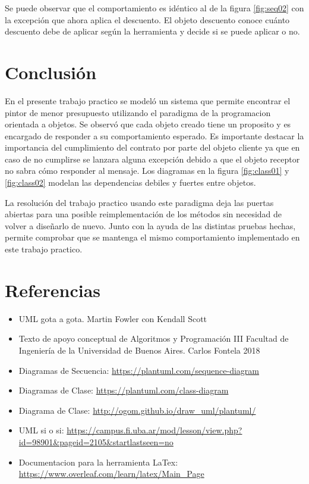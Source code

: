 \documentclass[titlepage,a4paper]{article}
\begin{document}
  Se puede observar que el comportamiento es idéntico al de la figura \ref{fig:seq02} 
  con la excepción que ahora aplica el descuento. El objeto descuento conoce cuánto descuento debe de aplicar según la herramienta 
  y decide si se puede aplicar o no.


  \section{Conclusión}
  
  En el presente trabajo practico se modeló un sistema que permite encontrar el pintor de menor presupuesto utilizando el paradigma de la programacion orientada a objetos. 
  Se observó que cada objeto creado tiene un proposito y es encargado de responder a su comportamiento esperado. Es importante destacar la 
  importancia del cumplimiento del contrato por parte del objeto cliente ya que en caso de no cumplirse se lanzara alguna excepción 
  debido a que el objeto receptor no sabra cómo responder al mensaje. Los diagramas en la figura \ref{fig:class01} y \ref{fig:class02} modelan las dependencias 
  debiles y fuertes entre objetos. \newline

  La resolución del trabajo practico usando este paradigma deja las puertas abiertas para una posible reimplementación de los métodos sin 
  necesidad de volver a diseñarlo de nuevo. Junto con la ayuda de las distintas pruebas hechas, permite comprobar que se mantenga el mismo 
  comportamiento implementado en este trabajo practico.

\newpage
\section{Referencias}

\begin{itemize}
  \item UML gota a gota. Martin Fowler con Kendall Scott
  \item Texto de apoyo conceptual de Algoritmos y Programación III Facultad de Ingeniería de la Universidad de Buenos Aires. Carlos Fontela 2018
  \item Diagramas de Secuencia: \url{https://plantuml.com/sequence-diagram}
  \item Diagramas de Clase: \url{https://plantuml.com/class-diagram}
  \item Diagrama de Clase: \url{http://ogom.github.io/draw_uml/plantuml/}
  \item UML si o si: \url{https://campus.fi.uba.ar/mod/lesson/view.php?id=98901&pageid=2105&startlastseen=no}
  \item Documentacion para la herramienta LaTex: \url{https://www.overleaf.com/learn/latex/Main_Page}
\end{itemize}
\end{document}
